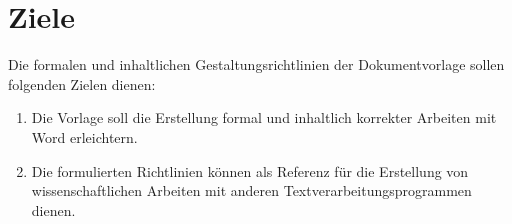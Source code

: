 \chapter{Ziele}\label{Ziele}

Die formalen und inhaltlichen Gestaltungsrichtlinien der Dokumentvorlage sollen folgenden Zielen dienen:

\begin{enumerate}
    \item{Die Vorlage soll die Erstellung formal und inhaltlich korrekter Arbeiten mit Word erleichtern.}
    \item{Die formulierten Richtlinien können als Referenz für die Erstellung von wissenschaftlichen Arbeiten mit anderen Textverarbeitungsprogrammen dienen.}
\end{enumerate}

